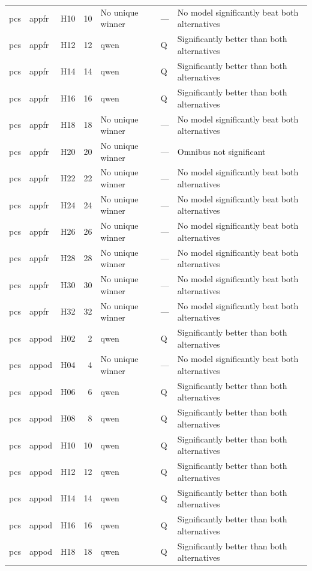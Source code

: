 \begin{longtable}{lllrlll}
pcs & appfr & H10 & 10 & No unique winner & — & No model significantly beat both alternatives \\
pcs & appfr & H12 & 12 & qwen & Q & Significantly better than both alternatives \\
pcs & appfr & H14 & 14 & qwen & Q & Significantly better than both alternatives \\
pcs & appfr & H16 & 16 & qwen & Q & Significantly better than both alternatives \\
pcs & appfr & H18 & 18 & No unique winner & — & No model significantly beat both alternatives \\
pcs & appfr & H20 & 20 & No unique winner & — & Omnibus not significant \\
pcs & appfr & H22 & 22 & No unique winner & — & No model significantly beat both alternatives \\
pcs & appfr & H24 & 24 & No unique winner & — & No model significantly beat both alternatives \\
pcs & appfr & H26 & 26 & No unique winner & — & No model significantly beat both alternatives \\
pcs & appfr & H28 & 28 & No unique winner & — & No model significantly beat both alternatives \\
pcs & appfr & H30 & 30 & No unique winner & — & No model significantly beat both alternatives \\
pcs & appfr & H32 & 32 & No unique winner & — & No model significantly beat both alternatives \\
pcs & appod & H02 & 2 & qwen & Q & Significantly better than both alternatives \\
pcs & appod & H04 & 4 & No unique winner & — & No model significantly beat both alternatives \\
pcs & appod & H06 & 6 & qwen & Q & Significantly better than both alternatives \\
pcs & appod & H08 & 8 & qwen & Q & Significantly better than both alternatives \\
pcs & appod & H10 & 10 & qwen & Q & Significantly better than both alternatives \\
pcs & appod & H12 & 12 & qwen & Q & Significantly better than both alternatives \\
pcs & appod & H14 & 14 & qwen & Q & Significantly better than both alternatives \\
pcs & appod & H16 & 16 & qwen & Q & Significantly better than both alternatives \\
pcs & appod & H18 & 18 & qwen & Q & Significantly better than both alternatives \\

\end{longtable}
